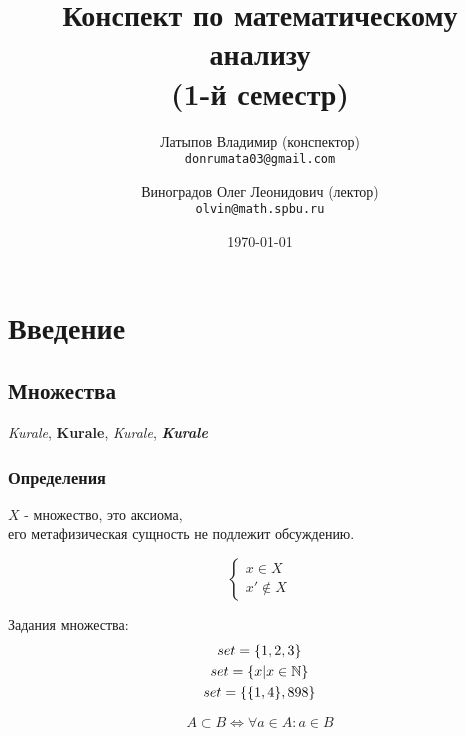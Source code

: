 \documentclass[12pt, a4paper]{article}
\title{Конспект по математическому анализу \\(1-й семестр)}
\author{
  Латыпов Владимир (конспектор)\\
  \texttt{donrumata03@gmail.com}
  \and
  Виноградов Олег Леонидович (лектор)\\
  \texttt{olvin@math.spbu.ru}
}
\date{\today}
\begin{document}
     \maketitle
     \newpage
     \tableofcontents
     \newpage
    

    \section{Введение}
    
    \subsection{Множества}
    
    \textit{Kurale}, 
    \textbf{Kurale},
    \textsl{Kurale},
    \textit{\textbf{Kurale}}


    \subsubsection{Определения}
    
    \begin{definition}[Множество]
      $X$ - множество, это аксиома, \\
      его метафизическая сущность не подлежит обсуждению.  
    \end{definition}
    
    \begin{equation}
      \begin{cases}
        x \in X \\
        x' \notin X
      \end{cases}
    \end{equation}

    \begin{example}
      Задания множества: 
      \begin{gather}
        set = \{1, 2, 3\} \\
        set = \{x | x \in {\mathbb{N}}\} \\
        set = \{\{1, 4\}, 898\}
      \end{gather}
    \end{example}
    
    \begin{definition}[Подмножество]
      \begin{equation}
        A \subset B \Longleftrightarrow \forall a \in A: a \in B
      \end{equation}
    \end{definition}
\end{document}
